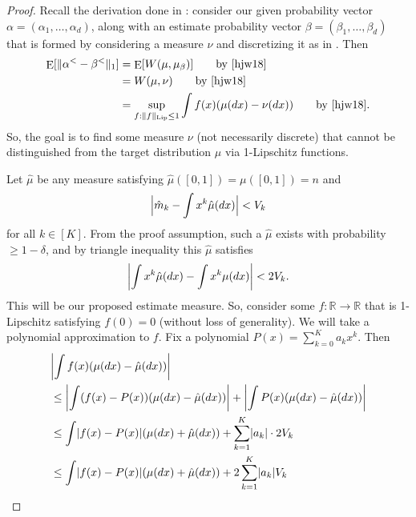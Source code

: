 \documentclass{article}
\theoremstyle{definition}
\DeclareMathOperator{\E}{E}
\DeclarePairedDelimiter{\abs}{\lvert}{\rvert}
\begin{document}
\begin{proof}
Recall the derivation done in \cite{hjw18}: consider our given probability vector $\alpha = (\alpha_1,\ldots,\alpha_d)$, along with an estimate probability vector $\beta = (\beta_1,\ldots,\beta_d)$ that is formed by considering a measure $\nu$ and discretizing it as in \cite[Definition~8]{hjw18}.
Then
\begin{align*}
    \E[\|\alpha^< - \beta^<\|_1] &= \E[W(\mu, \mu_\beta)] \tag*{by \cite[Lemma~7]{hjw18}} \\
    &= W(\mu, \nu) \tag*{by \cite[Lemma~9]{hjw18}}\\
    &= \sup_{f : \|f\|_{\mathrm{Lip}} \leq 1} \int f(x)(\mu(dx) - \nu(dx)) \tag*{by \cite[Lemma~10]{hjw18}}.
\end{align*}
So, the goal is to find some measure $\nu$ (not necessarily discrete) that cannot be distinguished from the target distribution $\mu$ via 1-Lipschitz functions.

Let $\hat{\mu}$ be any measure satisfying $\hat{\mu}([0,1]) = \mu([0,1]) = n$ and
\begin{align*}
    \abs[\Big]{\hat{m}_k - \int  x^k \hat{\mu}(dx)} < V_k
\end{align*}
for all $k \in [K]$.
From the proof assumption, such a $\hat{\mu}$ exists with probability $\geq 1-\delta$, and by triangle inequality this $\hat{\mu}$ satisfies
\begin{equation} \label{eqn:moments-good}
    \abs*{\int x^k\hat{\mu}(dx) - \int x^k \mu(dx)} < 2V_k.
\end{equation}
This will be our proposed estimate measure.
So, consider some $f: \mathbb{R} \to \mathbb{R}$ that is 1-Lipschitz satisfying $f(0) = 0$ (without loss of generality).
We will take a polynomial approximation to $f$.
Fix a polynomial $P(x) = \sum_{k=0}^K a_kx^k$.
Then
\begin{align*}
    &\abs*{\int f(x)(\mu(dx) - \hat{\mu}(dx))} \\
    & \leq \abs*{\int (f(x) - P(x))(\mu(dx) - \hat{\mu}(dx))} + \abs*{\int P(x)(\mu(dx) - \hat{\mu}(dx))} \\
    & \leq \int \abs{f(x) - P(x)}(\mu(dx) + \hat{\mu}(dx)) + \sum_{k=1}^K \abs{a_k}\cdot 2 V_k \\
    & \leq \int \abs{f(x) - P(x)}(\mu(dx) + \hat{\mu}(dx)) + 2\sum_{k=1}^K \abs{a_k}V_k
\end{align*}


\end{proof}
\end{document}
